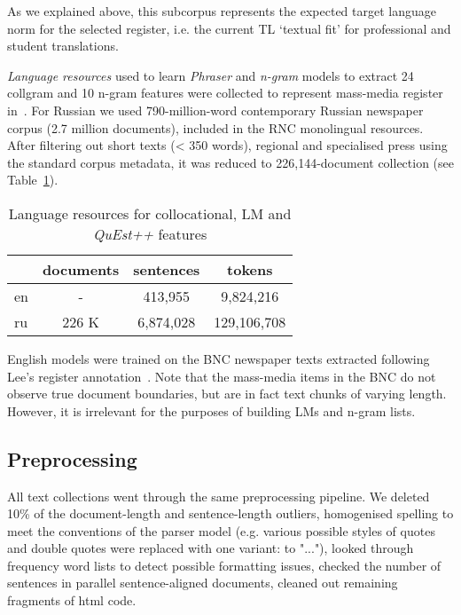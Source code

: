 As we explained above, this subcorpus represents the expected target language norm for the selected register, i.e. the current TL `textual fit' for professional and student translations.

\textit{Language resources} used to learn \textit{Phraser} and \textit{n-gram} models to extract 24 collgram and 10 n-gram features were collected to represent mass-media register in~\citet{Kunilovskaya2021regs}.
For Russian we used 790-million-word contemporary Russian newspaper corpus (2.7 million documents), included in the RNC monolingual resources. After filtering out short texts (< 350 words), regional and specialised press using the standard corpus metadata, it was reduced to 226,144-document collection (see Table~\ref{tab:lmres}).
 
\begin{table}[H]
	\centering
	\begin{tabular}{l|ccc}
	\toprule
		 & documents & sentences & tokens      \\
	\midrule
	en   & -         & 413,955   & 9,824,216   \\
	ru   & 226 K     & 6,874,028 & 129,106,708 \\ 
	\bottomrule
\end{tabular}
 \caption{\label{tab:lmres} Language resources for collocational, LM and \textit{QuEst++} features}
\end{table}

English models were trained on the \gls{BNC} newspaper texts extracted following Lee's register annotation~\cite{Lee01}. Note that the mass-media items in the BNC do not observe true document boundaries, but are in fact text chunks of varying length. However, it is irrelevant for the purposes of building LMs and n-gram lists.

\subsection{\label{ssec:prepro}Preprocessing}
All text collections went through the same preprocessing pipeline.
We deleted 10\% of the document-length and sentence-length outliers, homogenised spelling to meet the conventions of the parser model (e.g. various possible styles of quotes and double quotes were replaced with one variant:  to "..."), looked through frequency word lists to detect possible formatting issues, checked the number of sentences in parallel sentence-aligned documents, cleaned out remaining fragments of html code.

